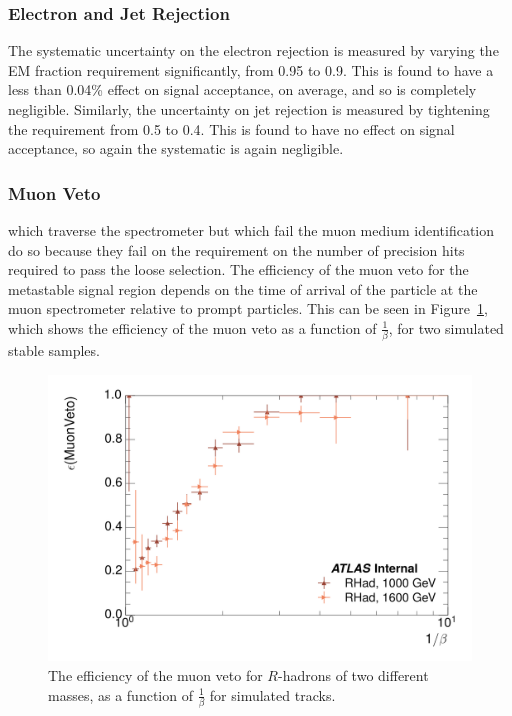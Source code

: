 \subsubsection{Electron and Jet Rejection}
The systematic uncertainty on the electron rejection is measured by varying the EM fraction requirement significantly, from 0.95 to 0.9. 
This is found to have a less than 0.04\% effect on signal acceptance, on average, and so is completely negligible. Similarly, the uncertainty on jet rejection is measured by tightening the \ep requirement from 0.5 to 0.4. 
This is found to have no effect on signal acceptance, so again the systematic is again negligible.

\subsubsection{Muon Veto}
\rhadrons which traverse the spectrometer but which fail the muon medium identification do so because they fail on the requirement on the number of precision hits required to pass the loose selection. 
The efficiency of the muon veto for the metastable signal region depends on the time of arrival of the particle at the muon spectrometer relative to prompt particles. 
This can be seen in Figure~\ref{fig:muonVeto_eff}, which shows the efficiency of the muon veto as a function of $\frac{1}{\beta}$, for two simulated stable \rhadron samples.

\begin{figure}
\centering
\includegraphics[width=.49\columnwidth]{figures/veff_invbeta.png}
\caption{The efficiency of the muon veto for $R$-hadrons of two different masses, as a function of $\frac{1}{\beta}$ for simulated \rhadron tracks.}
\label{fig:muonVeto_eff}
\end{figure}

